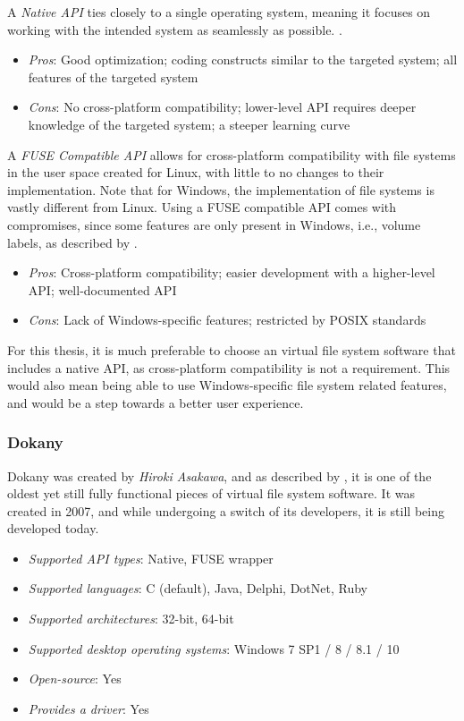 A \textit{Native API} ties closely to a single operating system, meaning it focuses on working with the intended system as seamlessly as possible. .
\begin{itemize}
    \item \textit{Pros}: Good optimization; coding constructs similar to the targeted system; all features of the targeted system
    \item \textit{Cons}: No cross-platform compatibility; lower-level API requires deeper knowledge of the targeted system; a steeper learning curve
\end{itemize}


A \textit{FUSE Compatible API} allows for cross-platform compatibility with file systems in the user space created for Linux, with little to no changes to their implementation. Note that for Windows, the implementation of file systems is vastly different from Linux. Using a FUSE compatible API comes with compromises, since some features are only present in Windows, i.e., volume labels, as described by \cite{WinFspVSFUSE}.

\begin{itemize}
    \item \textit{Pros}: Cross-platform compatibility; easier development with a higher-level API; well-documented API
    \item \textit{Cons}: Lack of Windows-specific features; restricted by POSIX standards
\end{itemize}

For this thesis, it is much preferable to choose an virtual file system software that includes a native API, as cross-platform compatibility is not a requirement. This would also mean being able to use Windows-specific file system related features, and would be a step towards a better user experience.

\subsubsection{Dokany}
Dokany was created by \textit{Hiroki Asakawa}, and as described by \cite{GitDokany}, it is one of the oldest yet still fully functional pieces of virtual file system software. It was created in 2007, and while undergoing a switch of its developers, it is still being developed today.
\begin{itemize}
    \item \textit{Supported API types}: Native, FUSE wrapper
    \item \textit{Supported languages}: C (default), Java, Delphi, DotNet, Ruby
    \item \textit{Supported architectures}: 32-bit, 64-bit
    \item \textit{Supported desktop operating systems}: Windows 7 SP1 / 8 / 8.1 / 10
    \item \textit{Open-source}: Yes
    \item \textit{Provides a driver}: Yes
\end{itemize}


